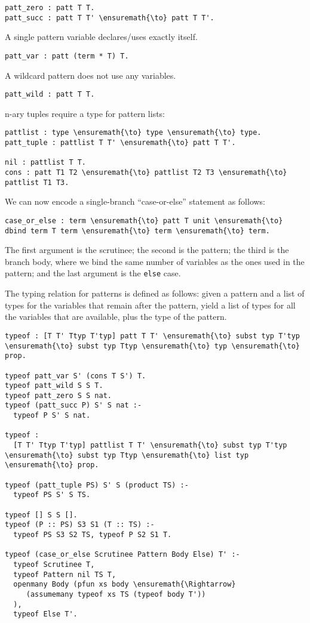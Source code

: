 \begin{verbatim}
patt_zero : patt T T.
patt_succ : patt T T' \ensuremath{\to} patt T T'.
\end{verbatim}

A single pattern variable declares/uses exactly itself.

\begin{verbatim}
patt_var : patt (term * T) T.
\end{verbatim}

A wildcard pattern does not use any variables.

\begin{verbatim}
patt_wild : patt T T.
\end{verbatim}

n-ary tuples require a type for pattern lists:

\begin{verbatim}
pattlist : type \ensuremath{\to} type \ensuremath{\to} type.
patt_tuple : pattlist T T' \ensuremath{\to} patt T T'.

nil : pattlist T T.
cons : patt T1 T2 \ensuremath{\to} pattlist T2 T3 \ensuremath{\to} pattlist T1 T3.
\end{verbatim}

We can now encode a single-branch ``case-or-else'' statement as follows:

\begin{verbatim}
case_or_else : term \ensuremath{\to} patt T unit \ensuremath{\to} dbind term T term \ensuremath{\to} term \ensuremath{\to} term.
\end{verbatim}

The first argument is the scrutinee; the second is the pattern; the
third is the branch body, where we bind the same number of variables as
the ones used in the pattern; and the last argument is the \texttt{else}
case.

The typing relation for patterns is defined as follows: given a pattern
and a list of types for the variables that remain after the pattern,
yield a list of types for all the variables that are available, plus the
type of the pattern.

\begin{verbatim}
typeof : [T T' Ttyp T'typ] patt T T' \ensuremath{\to} subst typ T'typ \ensuremath{\to} subst typ Ttyp \ensuremath{\to} typ \ensuremath{\to} prop.

typeof patt_var S' (cons T S') T.
typeof patt_wild S S T.
typeof patt_zero S S nat.
typeof (patt_succ P) S' S nat :-
  typeof P S' S nat.

typeof :
  [T T' Ttyp T'typ] pattlist T T' \ensuremath{\to} subst typ T'typ \ensuremath{\to} subst typ Ttyp \ensuremath{\to} list typ \ensuremath{\to} prop.

typeof (patt_tuple PS) S' S (product TS) :-
  typeof PS S' S TS.

typeof [] S S [].
typeof (P :: PS) S3 S1 (T :: TS) :-
  typeof PS S3 S2 TS, typeof P S2 S1 T.

typeof (case_or_else Scrutinee Pattern Body Else) T' :-
  typeof Scrutinee T,
  typeof Pattern nil TS T,
  openmany Body (pfun xs body \ensuremath{\Rightarrow}
     (assumemany typeof xs TS (typeof body T'))
  ),
  typeof Else T'.
\end{verbatim}

